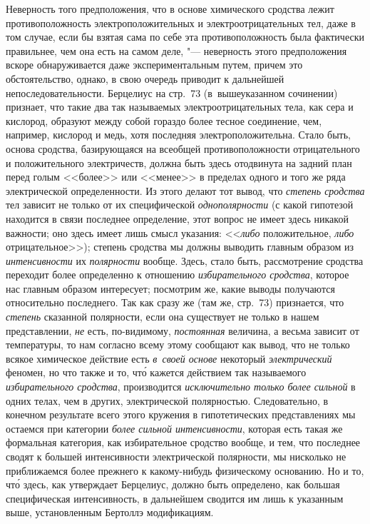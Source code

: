 Неверность того предположения, что в основе химического сродства лежит
противоположность электроположительных и электроотрицательных тел, даже в том
случае, если бы взятая сама по себе эта противоположность была фактически
правильнее, чем она есть на самом деле, "--- неверность этого предположения
вскоре обнаруживается даже экспериментальным путем, причем это обстоятельство,
однако, в свою очередь приводит к дальнейшей непоследовательности. Берцелиус на
стр.~73 (в~вышеуказанном сочинении) признает, что такие два так называемых
электроотрицательных тела, как сера и кислород, образуют между собой гораздо
более тесное соединение, чем, например, кислород и медь, хотя последняя
электроположительна. Стало быть, основа сродства, базирующаяся на всеобщей
противоположности отрицательного и положительного электричеств, должна быть
здесь отодвинута на задний план перед голым <<более>> или <<менее>> в пределах
одного и того же ряда электрической определенности. Из этого делают тот вывод,
что {\em степень сродства} тел зависит не только от их специфической
{\em однополярности} (с какой гипотезой находится в связи последнее
определение, этот вопрос не имеет здесь никакой важности; оно здесь имеет лишь
смысл указания: <<{\em либо} положительное, {\em либо} отрицательное>>);
степень сродства мы должны выводить главным образом из {\em интенсивности} их
{\em полярности} вообще. Здесь, стало быть, рассмотрение сродства переходит
более определенно к отношению {\em избирательного сродства}, которое нас
главным образом интересует; посмотрим же, какие выводы получаются относительно
последнего. Так как сразу же (там же, стр.~73) признается, что {\em степень}
сказанной полярности, если она существует не только в нашем представлении,
{\em не} есть, по-видимому, {\em постоянная} величина, а весьма зависит от
температуры, то нам согласно всему этому сообщают как вывод, что не только
всякое химическое действие есть {\em в~своей основе} некоторый
{\em электрический} феномен, но что также и то, чт\'{о} кажется действием так
называемого {\em избирательного сродства}, производится
{\em исключительно только более сильной} в одних телах, чем в других,
электрической полярностью. Следовательно, в конечном результате всего этого
кружения в гипотетических представлениях мы остаемся при категории
{\em более сильной интенсивности}, которая есть такая же формальная категория,
как избирательное сродство вообще, и тем, что последнее сводят к большей
интенсивности электрической полярности, мы нисколько не приближаемся более
прежнего к какому-нибудь физическому основанию. Но и то, чт\'{о} здесь, как
утверждает Берцелиус, должно быть определено, как большая специфическая
интенсивность, в дальнейшем сводится им лишь к указанным выше, установленным
Бертоллэ модификациям.

